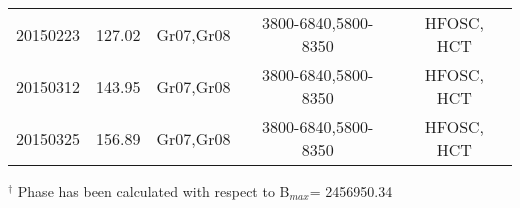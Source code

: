 \begin{table*}
\begin{tabular}{c c c c c}
20150223      & 127.02                   & Gr07,Gr08       & 3800-6840,5800-8350       & HFOSC, HCT     \\
20150312      & 143.95                   & Gr07,Gr08       & 3800-6840,5800-8350       & HFOSC, HCT    \\
20150325      & 156.89                   & Gr07,Gr08       & 3800-6840,5800-8350       & HFOSC, HCT     \\
\hline                                   
\end{tabular}
\newline
$^\dagger$ Phase has been calculated with respect to B$_{max}$= 2456950.34
\label{tab:spectroscopic_observations}      
\end{table*}
                   
